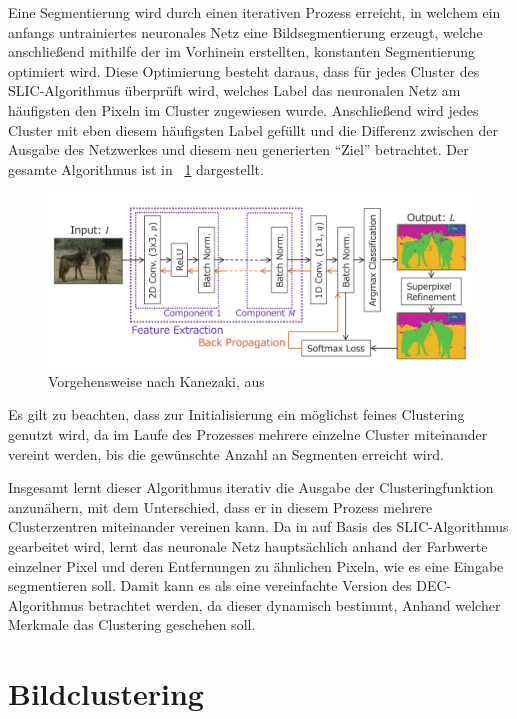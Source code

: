 Eine Segmentierung wird durch einen iterativen Prozess erreicht, in welchem ein anfangs untrainiertes neuronales Netz eine Bildsegmentierung erzeugt, welche anschließend mithilfe der im Vorhinein erstellten, konstanten Segmentierung optimiert wird. Diese Optimierung besteht daraus, dass für jedes Cluster des SLIC-Algorithmus überprüft wird, welches Label das neuronalen Netz am häufigsten den Pixeln im Cluster zugewiesen wurde. Anschließend wird jedes Cluster mit eben diesem häufigsten Label gefüllt und die Differenz zwischen der Ausgabe des Netzwerkes und diesem neu generierten \enquote{Ziel} betrachtet.
Der gesamte Algorithmus ist in \figurename~\ref{fig:Kan18_01} dargestellt. 

\begin{figure}[h!]
	\centering
	\includegraphics[width=.8\textwidth,keepaspectratio]{images/Kan18_01.png}
	\caption{Vorgehensweise nach Kanezaki, aus \cite{kanezaki_18}}
	\label{fig:Kan18_01}
\end{figure}

Es gilt zu beachten, dass zur Initialisierung ein möglichst feines Clustering genutzt wird, da im Laufe des Prozesses mehrere einzelne Cluster miteinander vereint werden, bis die gewünschte Anzahl an Segmenten erreicht wird.

Insgesamt lernt dieser Algorithmus iterativ die Ausgabe der Clusteringfunktion anzunähern, mit dem Unterschied, dass er in diesem Prozess mehrere Clusterzentren miteinander vereinen kann. Da in \cite{kanezaki_18} auf Basis des SLIC-Algorithmus gearbeitet wird, lernt das neuronale Netz hauptsächlich anhand der Farbwerte einzelner Pixel und deren Entfernungen zu ähnlichen Pixeln, wie es eine Eingabe segmentieren soll. Damit kann es als eine vereinfachte Version des DEC-Algorithmus betrachtet werden, da dieser dynamisch bestimmt, Anhand welcher Merkmale das Clustering geschehen soll.

\section{Bildclustering}
\label{ssec:clustering}


